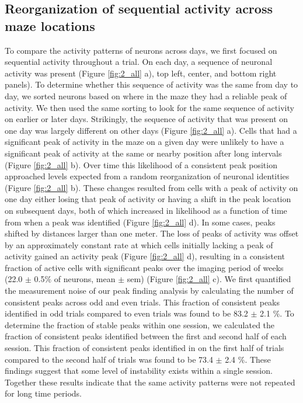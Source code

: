 \subsection{Reorganization of sequential activity across maze locations} \label{sec:chap3_peaks}
To compare the activity patterns of neurons across days, we first focused on sequential activity throughout a trial. On each day, a sequence of neuronal activity was present (Figure \ref{fig:2_all} a), top left, center, and bottom right panels). To determine whether this sequence of activity was the same from day to day, we sorted neurons based on where in the maze they had a reliable peak of activity. We then used the same sorting to look for the same sequence of activity on earlier or later days. Strikingly, the sequence of activity that was present on one day was largely different on other days (Figure \ref{fig:2_all} a). Cells that had a significant peak of activity in the maze on a given day were unlikely to have a significant peak of activity at the same or nearby position after long intervals (Figure \ref{fig:2_all} b). Over time this likelihood of a consistent peak position approached levels expected from a random reorganization of neuronal identities (Figure \ref{fig:2_all} b). These changes resulted from cells with a peak of activity on one day either losing that peak of activity or having a shift in the peak location on subsequent days, both of which increased in likelihood as a function of time from when a peak was identified (Figure \ref{fig:2_all} d). In some cases, peaks shifted by distances larger than one meter. The loss of peaks of activity was offset by an approximately constant rate at which cells initially lacking a peak of activity gained an activity peak (Figure \ref{fig:2_all} d), resulting in a consistent fraction of active cells with significant peaks over the imaging period of weeks (22.0 $\pm$ 0.5$\%$ of neurons, mean $\pm$ sem) (Figure \ref{fig:2_all} c). We first quantified the measurement noise of our peak finding analysis by calculating the number of consistent peaks across odd and even trials. This fraction of consistent peaks identified in odd trials compared to even trials was found to be 83.2 $\pm$ 2.1  $\%$. To determine the fraction of stable peaks within one session, we calculated the fraction of consistent peaks identified between the first and second half of each session. This fraction of consistent peaks identified in on the first half of trials compared to the second half of trials was found to be 73.4 $\pm$ 2.4  $\%$. These findings suggest that some level of instability exists within a single session. Together these results indicate that the same activity patterns were not repeated for long time periods.

